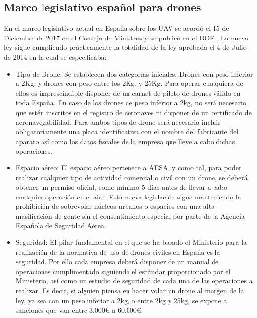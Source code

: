 \subsection{Marco legislativo español para drones}
\hspace{1cm} En el marco legislativo actual en España sobre los UAV se acordó el 15 de Diciembre de 2017 en el Consejo de Ministros y se publicó en el BOE \cite{BOE}. La nueva ley sigue cumpliendo prácticamente la totalidad de la ley aprobada el 4 de Julio de 2014 en la cual se especificaba: 
\begin{itemize}
		\item Tipo de Drone: Se establecen dos categorías iniciales: Drones con peso inferior a 2Kg. y drones con peso entre los 2Kg. y 25Kg. Para operar cualquiera de ellos es imprescindible disponer de un carnet de piloto de drones válido en toda España. En caso de los drones de peso inferior a 2kg, no será necesario que estén inscritos en el registro de aeronaves ni disponer de un certificado de aeronavegabilidad. Para ambos tipos de drone será necesario incluir obligatoriamente una placa identificativa con el nombre del fabricante del aparato así como los datos fiscales de la empresa que lleve a cabo dichas operaciones.
		\item Espacio aéreo: El espacio aéreo pertenece a AESA, y como tal, para poder realizar cualquier tipo de actividad comercial o civil con un drone, se deberá obtener un permiso oficial, como mínimo 5 días antes de llevar a cabo cualquier operación en el aire. Esta nueva legislación sigue manteniendo la prohibición de sobrevolar núcleos urbanos o espacios con una alta masificación de gente sin el consentimiento especial por parte de la Agencia Española de Seguridad Aérea.
		\item Seguridad: El pilar fundamental en el que se ha basado el Ministerio para la realización de la normativa de uso de drones civiles en España es la seguridad. Por ello cada empresa deberá disponer de un manual de operaciones cumplimentado siguiendo el estándar proporcionado por el Ministerio, así como un estudio de seguridad de cada una de las operaciones a realizar. Es decir, si alguien piensa en hacer volar un drone al margen de la ley, ya sea con un peso inferior a 2kg, o entre 2kg y 25kg, se expone a sanciones que van entre 3.000\textup{\euro} a 60.000\textup{\euro}.

\end{itemize}
